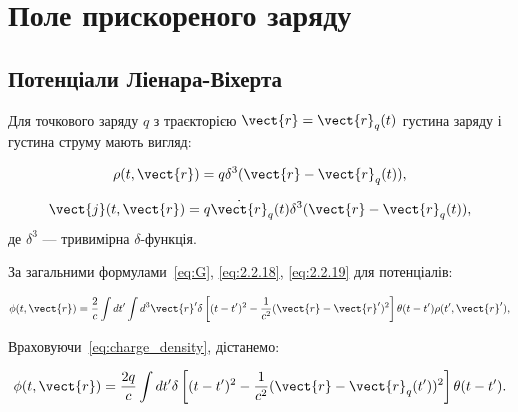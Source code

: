 \section{Поле прискореного заряду}

\subsection*{Потенціали Ліенара-Віхерта}

Для точкового заряду \( q \) з траєкторією \( \vect{r} = \vect{r}_q(t) \) густина заряду і густина струму мають вигляд:

\begin{equation}\label{eq:charge_density}
	\rho(t, \vect{r}) = q \delta^3(\vect{r} - \vect{r}_q(t)),
\end{equation}

\begin{equation}
	\vect{j}(t, \vect{r}) = q \dot{\vect{r}}_q(t) \delta^3(\vect{r} - \vect{r}_q(t)),
	\label{eq:current_density}
\end{equation}
%
де \( \delta^3 \) --- тривимірна \( \delta \)-функція.


За загальними формулами~\eqref{eq:G}, \eqref{eq:2.2.18}, \eqref{eq:2.2.19} для потенціалів:

\begin{equation*}
	\phi(t, \vect{r}) = \frac{2}{c} \int dt' \int d^3\vect{r}' \delta \left[ (t - t')^2 - \frac{1}{c^2} (\vect{r} - \vect{r}')^2 \right] \theta (t - t')
	\rho (t', \vect{r}'),
	\label{eq:general_potential}
\end{equation*}

Враховуючи~\eqref{eq:charge_density}, дістанемо:

\begin{equation*}
	\phi(t, \vect{r}) = \frac{2q}{c} \int dt' \delta \left[ (t - t')^2 - \frac{1}{c^2} (\vect{r} - \vect{r}_q (t'))^2 \right] \theta (t - t').
	\label{eq:potential_with_delta}
\end{equation*}

